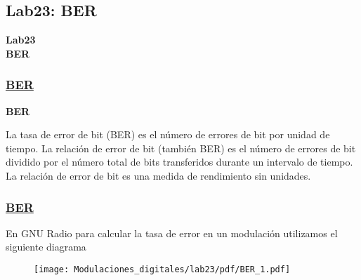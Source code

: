\subsection{Lab23: BER}

\begin{frame}{}


\bfseries{\textrm{\LARGE Lab23\\ \Large BER}}
\raggedright
\end{frame}

\begin{frame}

\frametitle{\underline{\textbf{BER}}}

  \begin{center}
  \textbf{BER}
  \end{center}
  
  \begin{flushleft}
  La tasa de error de bit (BER) es el número de errores de bit por unidad de tiempo. La relación de error de bit (también BER) es el número de errores de bit dividido por el número total de bits transferidos durante un intervalo de tiempo. La relación de error de bit es una medida de rendimiento sin unidades.
  \end{flushleft}
  
\end{frame} 
 
\begin{frame} 

\frametitle{\underline{\textbf{BER}}}
  \begin{flushleft}
  {En GNU Radio para calcular la tasa de error en un modulación utilizamos el siguiente diagrama}
  \end{flushleft}
  \begin{figure}[H]
  \vspace{-3mm}
  \centering
  \texttt{[image: Modulaciones\_digitales/lab23/pdf/BER\_1.pdf]}
  \end{figure}
\end{frame}  

